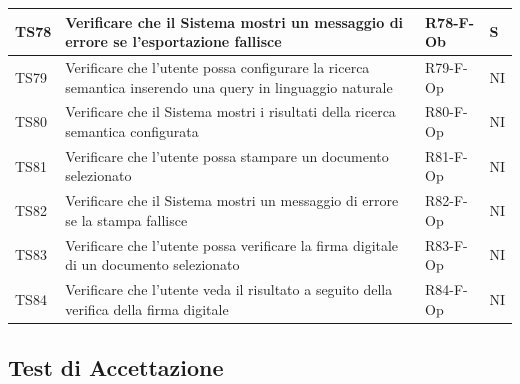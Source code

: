 \documentclass[a4paper,12pt]{article}
\begin{document}
\begin{longtable}{|M{1.2cm}|M{6.3cm}|M{2.5cm}|M{1.5cm}|}
                TS78 & Verificare che il Sistema mostri un messaggio di errore se l'esportazione fallisce & R78-F-Ob & S \\
                \hline

                TS79 & Verificare che l'utente possa configurare la ricerca semantica inserendo una query in linguaggio naturale & R79-F-Op & NI \\
                \hline

                TS80 & Verificare che il Sistema mostri i risultati della ricerca semantica configurata & R80-F-Op & NI \\
                \hline

                TS81 & Verificare che l'utente possa stampare un documento selezionato & R81-F-Op & NI \\
                \hline

                TS82 & Verificare che il Sistema mostri un messaggio di errore se la stampa fallisce & R82-F-Op & NI \\
                \hline

                TS83 & Verificare che l'utente possa verificare la firma digitale di un documento selezionato & R83-F-Op & NI \\
                \hline

                TS84 & Verificare che l'utente veda il risultato a seguito della verifica della firma digitale & R84-F-Op & NI \\
                \hline

            \end{longtable}

        \subsection{Test di Accettazione}
        
\end{document}
